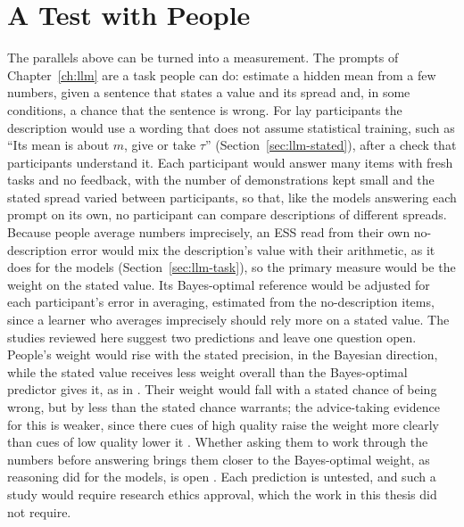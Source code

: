 \section{A Test with People}\label{sec:hl-test}
The parallels above can be turned into a measurement. The prompts of Chapter~\ref{ch:llm} are a task people can do: estimate a hidden mean from a few numbers, given a sentence that states a value and its spread and, in some conditions, a chance that the sentence is wrong. For lay participants the description would use a wording that does not assume statistical training, such as ``Its mean is about $m$, give or take $\tau$'' (Section~\ref{sec:llm-stated}), after a check that participants understand it. Each participant would answer many items with fresh tasks and no feedback, with the number of demonstrations kept small and the stated spread varied between participants, so that, like the models answering each prompt on its own, no participant can compare descriptions of different spreads. Because people average numbers imprecisely, an ESS read from their own no-description error would mix the description's value with their arithmetic, as it does for the models (Section~\ref{sec:llm-task}), so the primary measure would be the weight on the stated value. Its Bayes-optimal reference would be adjusted for each participant's error in averaging, estimated from the no-description items, since a learner who averages imprecisely should rely more on a stated value. The studies reviewed here suggest two predictions and leave one question open. People's weight would rise with the stated precision, in the Bayesian direction, while the stated value receives less weight overall than the Bayes-optimal predictor gives it, as in \citet{acerbi2014}. Their weight would fall with a stated chance of being wrong, but by less than the stated chance warrants; the advice-taking evidence for this is weaker, since there cues of high quality raise the weight more clearly than cues of low quality lower it \citep{bailey2023}. Whether asking them to work through the numbers before answering brings them closer to the Bayes-optimal weight, as reasoning did for the models, is open \citep{berry1984, bago2017}. Each prediction is untested, and such a study would require research ethics approval, which the work in this thesis did not require.
